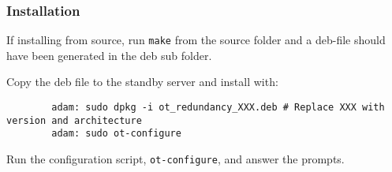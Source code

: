 \documentclass[a4paper]{article}
\begin{document}
\subsubsection{Installation}
	If installing from source, run \texttt{make} from the source folder and a deb-file should have been generated in the deb sub folder.
	
	Copy the deb file to the standby server and install with:
	\begin{verbatim}
		adam: sudo dpkg -i ot_redundancy_XXX.deb # Replace XXX with version and architecture
		adam: sudo ot-configure
	\end{verbatim}
	Run the configuration script, \texttt{ot-configure}, and answer the prompts.
	








\end{document}
